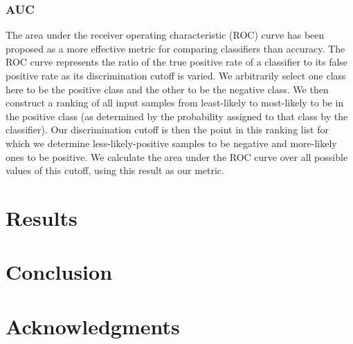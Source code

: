\documentclass{article} %
\begin{document}
\subsubsection{AUC}
The area under the receiver operating characteristic (ROC) curve has been proposed \cite{DBLP:conf/ijcai/LingHZ03} as a more effective metric for comparing classifiers than accuracy.  The ROC curve represents the ratio of the true positive rate of a classifier to its false positive rate as its discrimination cutoff is varied.  We arbitrarily select one class here to be the positive class and the other to be the negative class.  We then construct a ranking of all input samples from least-likely to most-likely to be in the positive class (as determined by the probability assigned to that class by the classifier).  Our discrimination cutoff is then the point in this ranking list for which we determine less-likely-positive samples to be negative and more-likely ones to be positive.  We calculate the area under the ROC curve over all possible values of this cutoff, using this result as our metric.

\section{Results} \label{section:results}

\section{Conclusion} \label{section:conclusion}

\section*{Acknowledgments}


\printbibliography
\end{document}
